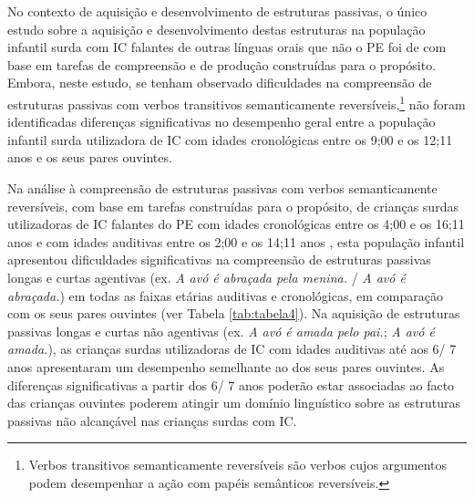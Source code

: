 \documentclass[output=paper,colorlinks,citecolor=brown,booklanguage=portuguese]{langscibook}
\begin{document}
No contexto de aquisição e desenvolvimento de estruturas passivas, o único estudo sobre a aquisição e desenvolvimento destas estruturas na população infantil surda com IC falantes de outras línguas orais que não o PE foi de \citet{Ruigendijk2017} com base em tarefas de compreensão e de produção construídas para o propósito. Embora, neste estudo, se tenham observado dificuldades na compreensão de estruturas passivas com verbos transitivos semanticamente reversíveis,\footnote{Verbos transitivos semanticamente reversíveis são verbos cujos argumentos podem desempenhar a ação com papéis semânticos reversíveis.} não foram identificadas diferenças significativas no desempenho geral entre a população infantil surda utilizadora de IC com idades cronológicas entre os 9;00 e os 12;11 anos e os seus pares ouvintes.

Na análise à compreensão de estruturas passivas com verbos semanticamente reversíveis, com base em tarefas construídas para o propósito, de crianças surdas utilizadoras de IC falantes do PE com idades cronológicas entre os 4;00 e os 16;11 anos e com idades auditivas entre os 2;00 e os 14;11 anos \citep{Moita2019}, esta população infantil apresentou dificuldades significativas na compreensão de estruturas passivas longas e curtas agentivas (ex. \emph{A avó é abraçada pela menina.} / \emph{A avó é abraçada.}) em todas as faixas etárias auditivas e cronológicas, em comparação com os seus pares ouvintes (ver Tabela \ref{tab:tabela4}). Na aquisição de estruturas passivas longas e curtas não agentivas (ex. \emph{A avó é amada pelo pai.}; \emph{A avó é amada.}), as crianças surdas utilizadoras de IC com idades auditivas até aos 6/ 7 anos apresentaram um desempenho semelhante ao dos seus pares ouvintes. As diferenças significativas a partir dos 6/ 7 anos poderão estar associadas ao facto das crianças ouvintes poderem atingir um domínio linguístico sobre as estruturas passivas não alcançável nas crianças surdas com IC.
\end{document}
